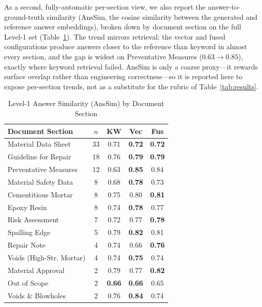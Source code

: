 \documentclass[10pt,a4paper,conference]{IEEEtran}
\begin{document}
As a second, fully-automatic per-section view, we also report the
answer-to-ground-truth similarity (AnsSim, the cosine similarity
between the generated and reference answer embeddings), broken down by document
section on the full Level-1 set
(Table~\ref{tab:e2esub}). The trend mirrors retrieval: the vector and fused
configurations produce answers closer to the reference than keyword in almost
every section, and the gap is widest on Preventative Measures
($0.63 \rightarrow 0.85$), exactly where keyword retrieval failed. AnsSim is only
a coarse proxy---it rewards surface overlap rather than engineering
correctness---so it is reported here to expose per-section trends, not as a
substitute for the rubric of Table~\ref{tab:results}.

\begin{table}[htbp]
\caption{Level-1 Answer Similarity (AnsSim) by Document Section}
\begin{center}
\footnotesize
\begin{tabular}{|p{}|c|ccc|}
\hline
\textbf{Document Section} & \textbf{$n$} & \textbf{KW} & \textbf{Vec} & \textbf{Fus} \\
\hline
Material Data Sheet & 33 & 0.71 & \textbf{0.72} & \textbf{0.72} \\
\hline
Guideline for Repair & 18 & 0.76 & \textbf{0.79} & \textbf{0.79} \\
\hline
Preventative Measures & 12 & 0.63 & \textbf{0.85} & 0.84 \\
\hline
Material Safety Data & 8 & 0.68 & \textbf{0.78} & 0.73 \\
\hline
Cementitious Mortar & 8 & 0.75 & 0.80 & \textbf{0.81} \\
\hline
Epoxy Resin & 8 & 0.74 & \textbf{0.78} & 0.77 \\
\hline
Risk Assessment & 7 & 0.72 & 0.77 & \textbf{0.78} \\
\hline
Spalling Edge & 5 & 0.79 & \textbf{0.82} & 0.81 \\
\hline
Repair Note & 4 & 0.74 & 0.66 & \textbf{0.76} \\
\hline
Voids (High-Str. Mortar) & 4 & 0.74 & \textbf{0.75} & 0.74 \\
\hline
Material Approval & 2 & 0.79 & 0.77 & \textbf{0.82} \\
\hline
Out of Scope & 2 & \textbf{0.66} & \textbf{0.66} & 0.65 \\
\hline
Voids \& Blowholes & 2 & 0.76 & \textbf{0.84} & 0.74 \\
\hline
\end{tabular}
\label{tab:e2esub}
\end{center}
\end{table}
\end{document}
